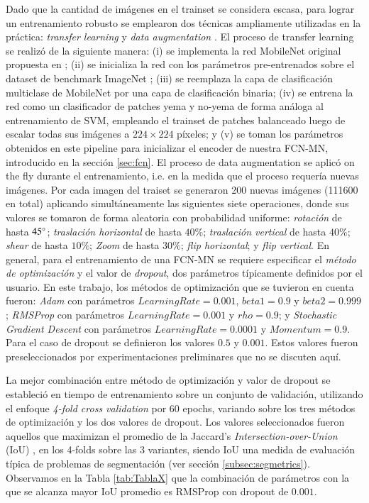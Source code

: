 \documentclass[a4paper,authoryear,review]{elsarticle}
\begin{document}
Dado que la cantidad de imágenes en el trainset se considera escasa, para lograr un entrenamiento robusto se emplearon dos técnicas ampliamente utilizadas en la práctica: \emph{transfer learning} \cite{pan2009survey} y \emph{data augmentation} \cite{shorten2019survey}. El proceso de transfer learning se realizó de la siguiente manera: (i) se implementa la red MobileNet original propuesta en \citet{howard2017mobilenets}; (ii) se inicializa la red con los parámetros pre-entrenados sobre el dataset de benchmark ImageNet \cite{kornblith2019better}; (iii) se reemplaza la capa de clasificación multiclase de MobileNet por una capa de clasificación binaria; (iv) se entrena la red como un clasificador de patches yema y no-yema de forma análoga al entrenamiento de SVM, empleando el trainset de patches balanceado luego de escalar todas sus imágenes a $224 \times 224$ píxeles; y (v) se toman los parámetros obtenidos en este pipeline para inicializar el encoder de nuestra FCN-MN, introducido en la sección \ref{sec:fcn}. El proceso de data augmentation se aplicó on the fly durante el entrenamiento, i.e. en la medida que el proceso requería nuevas imágenes. Por cada imagen del traiset se generaron 200 nuevas imágenes (111600 en total) aplicando simultáneamente las siguientes siete operaciones, donde sus valores se tomaron de forma aleatoria con probabilidad uniforme: \emph{rotación} de hasta $45\degree$; \emph{traslación horizontal} de hasta $40\%$; \emph{traslación vertical} de hasta $40\%$; \emph{shear} de hasta $10\%$; \emph{Zoom} de hasta $30\%$; \emph{flip horizontal}; y \emph{flip vertical}. 
%
En general, para el entrenamiento de una FCN-MN se requiere especificar el \emph{método de optimización} y el valor de \emph{dropout}, dos parámetros típicamente definidos por el usuario. En este trabajo, los  métodos de optimización que se tuvieron en cuenta fueron: \emph{Adam} con parámetros $Learning Rate = 0.001$, $beta1= 0.9$ y $beta2 = 0.999$; \emph{RMSProp} con parámetros $Learning Rate = 0.001$ y $rho = 0.9$; y \emph{Stochastic Gradient Descent} con parámetros $Learning Rate = 0.0001$ y $Momentum = 0.9$. Para el caso de dropout se definieron los valores $0.5$ y $0.001$. Estos valores fueron preseleccionados por experimentaciones preliminares que no se discuten aquí.

%
La mejor combinación entre método de optimización y valor de dropout se estableció en tiempo de entrenamiento sobre un conjunto de validación, utilizando el enfoque \emph{4-fold cross validation} por 60 epochs, variando sobre los tres métodos de optimización y los dos valores de dropout. Los valores seleccionados fueron aquellos que maximizan el promedio de la Jaccard’s \emph{Intersection-over-Union} (IoU) \citep{jaccard1912distribution},  en los 4-folds sobre las 3 variantes, siendo IoU una medida de evaluación típica de problemas de segmentación (ver sección \ref{subsec:segmetrics}). Observamos en la Tabla \ref{tab:TablaX} que la combinación de parámetros con la que se alcanza mayor IoU promedio es RMSProp con dropout de $0.001$. 
\end{document}
